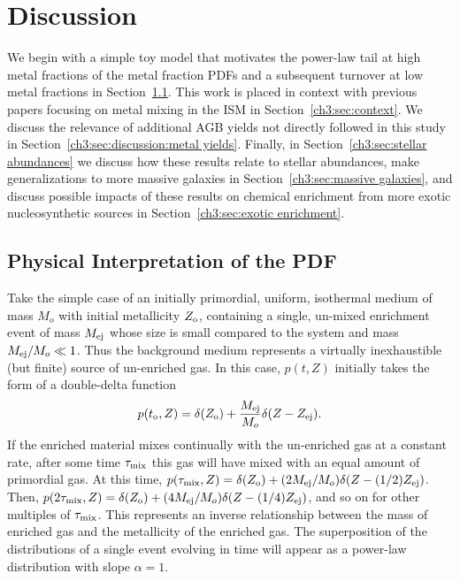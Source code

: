\section{Discussion}
\label{ch3:sec:discussion}
We begin with a simple toy model that motivates the power-law tail at high metal fractions of the metal fraction PDFs and a subsequent turnover at low metal fractions in Section~\ref{ch3:sec:interpretation}. This work is placed in context with previous papers focusing on metal mixing in the ISM in Section~\ref{ch3:sec:context}. We discuss the relevance of additional AGB yields not directly followed in this study in Section~\ref{ch3:sec:discussion:metal yields}. Finally, in Section~\ref{ch3:sec:stellar abundances} we discuss how these results relate to stellar abundances, make generalizations to more massive galaxies in Section~\ref{ch3:sec:massive galaxies}, and discuss possible impacts of these results on chemical enrichment from more exotic nucleosynthetic sources in Section~\ref{ch3:sec:exotic enrichment}.

\subsection{Physical Interpretation of the PDF}
\label{ch3:sec:interpretation}
%
Take the simple case of an initially primordial, uniform, isothermal medium of mass $M_o$ with initial metallicity $Z_{\rm o}$, containing a single, un-mixed enrichment event of mass $M_{\rm ej}$ whose size is small compared to the system and mass $M_{\rm ej} / M_o \ll 1$. Thus the background medium represents a virtually inexhaustible (but finite) source of un-enriched gas. In this case, $p(t,Z)$ initially takes the form of a double-delta function
\begin{equation}
p(t_{\rm o},Z) = \delta(Z_{\rm o}) + \frac{M_{\rm ej}}{M_o}\delta(Z - Z_{\rm ej}).
\end{equation}
If the enriched material mixes continually with the un-enriched gas at a constant rate, after some time  $\tau_{\rm mix}$ this gas will have mixed with an equal amount of primordial gas. At this time, $p(\tau_{\rm mix},Z) = \delta(Z_{\rm o}) + (2M_{\rm ej}/M_o) \delta(Z - (1/2)Z_{\rm ej})$. Then, $p(2\tau_{\rm mix},Z) = \delta(Z_{\rm o}) + (4M_{\rm ej}/M_o)\delta(Z - (1/4) Z_{\rm ej})$, and so on for other multiples of $\tau_{\rm mix}$. This represents an inverse relationship between the mass of enriched gas and the metallicity of the enriched gas. The superposition of the distributions of a single event evolving in time will appear as a power-law distribution with slope $\alpha = 1$.


